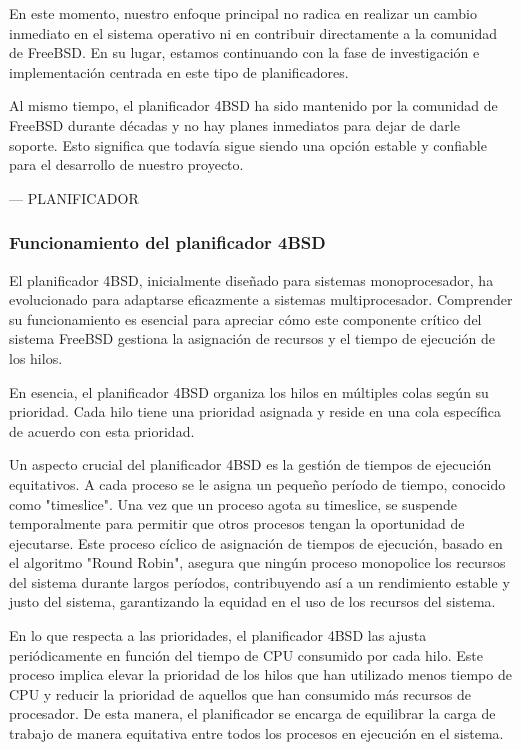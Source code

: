 En este momento, nuestro enfoque principal no radica en realizar un cambio inmediato en el sistema operativo ni en contribuir directamente a la comunidad de FreeBSD\@. En su lugar, estamos continuando con la fase de investigación e implementación centrada en este tipo de planificadores.\par

Al mismo tiempo, el planificador 4BSD ha sido mantenido por la comunidad de FreeBSD durante décadas y no hay planes inmediatos para dejar de darle soporte. Esto significa que todavía sigue siendo una opción estable y confiable para el desarrollo de nuestro proyecto.\par


--- PLANIFICADOR

\subsubsection{Funcionamiento del planificador 4BSD}

El planificador 4BSD, inicialmente diseñado para sistemas monoprocesador, ha evolucionado para adaptarse eficazmente a sistemas multiprocesador. Comprender su funcionamiento es esencial para apreciar cómo este componente crítico del sistema FreeBSD gestiona la asignación de recursos y el tiempo de ejecución de los hilos.\par

En esencia, el planificador 4BSD organiza los hilos en múltiples colas según su prioridad. Cada hilo tiene una prioridad asignada y reside en una cola específica de acuerdo con esta prioridad.\par

Un aspecto crucial del planificador 4BSD es la gestión de tiempos de ejecución equitativos. A cada proceso se le asigna un pequeño período de tiempo, conocido como "timeslice". Una vez que un proceso agota su timeslice, se suspende temporalmente para permitir que otros procesos tengan la oportunidad de ejecutarse. Este proceso cíclico de asignación de tiempos de ejecución, basado en el algoritmo "Round Robin", asegura que ningún proceso monopolice los recursos del sistema durante largos períodos, contribuyendo así a un rendimiento estable y justo del sistema,  garantizando la equidad en el uso de los recursos del sistema.\par

En lo que respecta a las prioridades, el planificador 4BSD las ajusta periódicamente en función del tiempo de CPU consumido por cada hilo. Este proceso implica elevar la prioridad de los hilos que han utilizado menos tiempo de CPU y reducir la prioridad de aquellos que han consumido más recursos de procesador. De esta manera, el planificador se encarga de equilibrar la carga de trabajo de manera equitativa entre todos los procesos en ejecución en el sistema.\par


